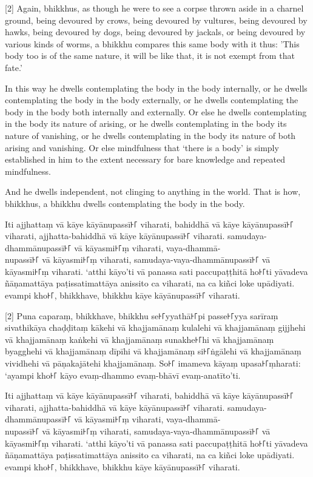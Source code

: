 [2] Again, bhikkhus, as though he were to see a corpse thrown aside in a charnel
ground, being devoured by crows, being devoured by vultures, being devoured by
hawks, being devoured by dogs, being devoured by jackals, or being devoured by
various kinds of worms, a bhikkhu compares this same body with it thus: 'This
body too is of the same nature, it will be like that, it is not exempt from that
fate.'

In this way he dwells contemplating the body in the body internally, or he
dwells contemplating the body in the body externally, or he dwells contemplating
the body in the body both internally and externally. Or else he dwells
contemplating in the body its nature of arising, or he dwells contemplating in
the body its nature of vanishing, or he dwells contemplating in the body its
nature of both arising and vanishing. Or else mindfulness that ‘there is a body’
is simply established in him to the extent necessary for bare knowledge and
repeated mindfulness.

And he dwells independent, not clinging to anything in the world. That is how,
bhikkhus, a bhikkhu dwells contemplating the body in the body.

\paliPage

Iti ajjhattaṃ vā kāye kāyānupassī꜔꜒ viharati, bahiddhā vā kāye kāyānupassī꜔꜒
viharati, ajjhatta-bahiddhā vā kāye kāyānupassī꜔꜒ viharati. samudaya-dhammānupassī꜔꜒
vā kāyasmi꜔꜒ṃ viharati, vaya-dhammā-\\
nupassī꜔꜒ vā kāyasmi꜔꜒ṃ viharati, samudaya-vaya-dhammānupassī꜔꜒ vā kāyasmi꜔꜒ṃ viharati.
‘atthi kāyo’ti vā panassa sati paccupaṭṭhitā ho꜔꜒ti yāvadeva ñāṇamattāya
paṭissatimattāya anissito ca viharati, na ca kiñci loke upādiyati. evampi kho꜔꜒,
bhikkhave, bhikkhu kāye kāyānupassī꜔꜒ viharati.

[2] Puna caparaṃ, bhikkhave, bhikkhu se꜔꜒yyathā꜔꜒pi passe꜔꜒yya sarīraṃ sivathikāya
chaḍḍitaṃ kākehi vā khajjamānaṃ kulalehi vā khajjamānaṃ gijjhehi vā khajjamānaṃ
kaṅkehi vā khajjamānaṃ sunakhe꜔꜒hi vā khajjamānaṃ byagghehi vā khajjamānaṃ dīpīhi
vā khajjamānaṃ si꜔꜒ṅgālehi vā khajjamānaṃ vividhehi vā pāṇakajātehi khajjamānaṃ.
So꜔꜒ imameva kāyaṃ upasa꜔꜒ṃharati: ‘ayampi kho꜔꜒ kāyo evaṃ-dhammo evaṃ-bhāvī
evaṃ-anatīto’ti.

Iti ajjhattaṃ vā kāye kāyānupassī꜔꜒ viharati, bahiddhā vā kāye kāyānupassī꜔꜒
viharati, ajjhatta-bahiddhā vā kāye kāyānupassī꜔꜒ viharati. samudaya-dhammānupassī꜔꜒
vā kāyasmi꜔꜒ṃ viharati, vaya-dhammā-\\
nupassī꜔꜒ vā kāyasmi꜔꜒ṃ viharati, samudaya-vaya-dhammānupassī꜔꜒ vā kāyasmi꜔꜒ṃ viharati.
‘atthi kāyo’ti vā panassa sati paccupaṭṭhitā ho꜔꜒ti yāvadeva ñāṇamattāya
paṭissatimattāya anissito ca viharati, na ca kiñci loke upādiyati. evampi kho꜔꜒,
bhikkhave, bhikkhu kāye kāyānupassī꜔꜒ viharati.

